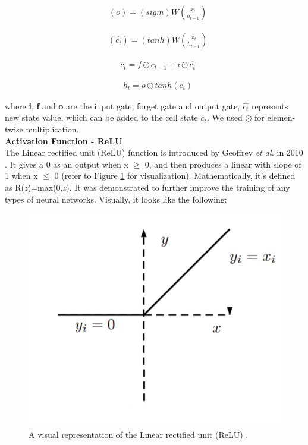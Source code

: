\documentclass{vldb}
\begin{document}
\begin{align}
   & \left ( o \right ) = \left ( sigm \right ) W\binom{x_{t}}{h_{t-1}}
\end{align}

\begin{align}
   & \left ( \hat{c_{t}} \right ) = \left ( tanh \right ) W\binom{x_{t}}{h_{t-1}}
\end{align}

\begin{align}
   & c_{t}=f\odot c_{t-1}+i\odot \hat{c_{t}}
\end{align}

\begin{align}
   & h_{t}=o\odot tanh \left (c_{t}\right )
\end{align}

where \textbf{i}, \textbf{f} and \textbf{o} are the input gate, forget gate and output gate, $\hat{c_{t}}$ represents new state value, which can be added to the cell state $c_{t}$. We used $\odot$ for elemen-twise multiplication.\\

\textbf{Activation Function - ReLU}\\

The Linear rectified unit (ReLU) function is introduced by Geoffrey \textit{et al.} in 2010 \cite{nair2010rectified}. It gives a 0 as an output
when x $\geq$ 0, and then produces a linear with slope of 1 when x $\leq$ 0 (refer to Figure \ref{fig:relufunction} for visualization).
Mathematically, it's defined as R(\textit{z})=max(0,\textit{z})\label{eq:111}. It was demonstrated to further improve the training of any types of neural networks. Visually, it looks like the following:\\


\begin{figure}[ht]
\centering
\includegraphics[width=0.7\columnwidth]{photo/relufunction.PNG}
\caption{A visual representation of the Linear rectified unit (ReLU) \cite{nair2010rectified}.}
\label{fig:relufunction}
\end{figure}
\end{document}
